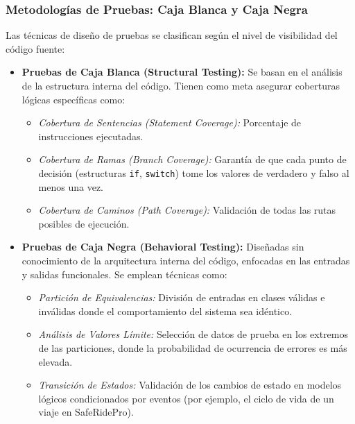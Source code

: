 \documentclass{article}
\begin{document}
\subsubsection*{Metodologías de Pruebas: Caja Blanca y Caja Negra}
Las técnicas de diseño de pruebas se clasifican según el nivel de visibilidad del código fuente:
\begin{itemize}
    \item \textbf{Pruebas de Caja Blanca (Structural Testing):} Se basan en el análisis de la estructura interna del código. Tienen como meta asegurar coberturas lógicas específicas como:
    \begin{itemize}
        \item \textit{Cobertura de Sentencias (Statement Coverage):} Porcentaje de instrucciones ejecutadas.
        \item \textit{Cobertura de Ramas (Branch Coverage):} Garantía de que cada punto de decisión (estructuras \texttt{if}, \texttt{switch}) tome los valores de verdadero y falso al menos una vez.
        \item \textit{Cobertura de Caminos (Path Coverage):} Validación de todas las rutas posibles de ejecución.
    \end{itemize}
    \item \textbf{Pruebas de Caja Negra (Behavioral Testing):} Diseñadas sin conocimiento de la arquitectura interna del código, enfocadas en las entradas y salidas funcionales. Se emplean técnicas como:
    \begin{itemize}
        \item \textit{Partición de Equivalencias:} División de entradas en clases válidas e inválidas donde el comportamiento del sistema sea idéntico.
        \item \textit{Análisis de Valores Límite:} Selección de datos de prueba en los extremos de las particiones, donde la probabilidad de ocurrencia de errores es más elevada.
        \item \textit{Transición de Estados:} Validación de los cambios de estado en modelos lógicos condicionados por eventos (por ejemplo, el ciclo de vida de un viaje en SafeRidePro).
    \end{itemize}
\end{itemize}
\end{document}
